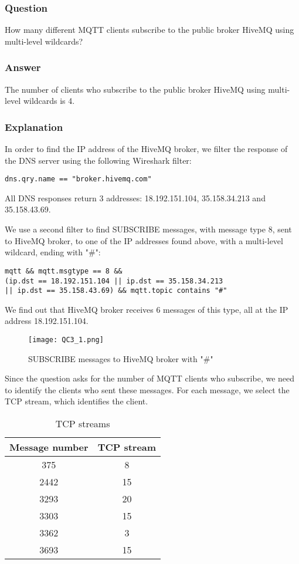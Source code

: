 \subsubsection{Question}
How many different MQTT clients subscribe to the public broker HiveMQ using multi-level wildcards?

\subsubsection{Answer}
The number of clients who subscribe to the public broker HiveMQ using multi-level wildcards is 4.

\subsubsection{Explanation}
In order to find the IP address of the HiveMQ broker, we filter the response of the DNS server using the following Wireshark filter:
\begin{verbatim}
dns.qry.name == "broker.hivemq.com"
\end{verbatim}
All DNS responses return 3 addresses: 18.192.151.104, 35.158.34.213 and 35.158.43.69.

We use a second filter to find SUBSCRIBE messages, with message type 8, sent to HiveMQ broker, to one of the IP addresses found above, with a multi-level wildcard, ending with "\#": 
\begin{verbatim}
mqtt && mqtt.msgtype == 8 && 
(ip.dst == 18.192.151.104 || ip.dst == 35.158.34.213 
|| ip.dst == 35.158.43.69) && mqtt.topic contains "#"
\end{verbatim}
We find out that HiveMQ broker receives 6 messages of this type, all at the IP address 18.192.151.104.

\begin{figure}[H]
    \centering
    \texttt{[image: QC3\_1.png]}
    \caption{SUBSCRIBE messages to HiveMQ broker with "\#"}
\end{figure}

Since the question asks for the number of MQTT clients who subscribe, we need to identify the clients who sent these messages. For each message, we select the TCP stream, which identifies the client.\\

\begin{table}[H]
\centering 
\begin{tabular}{| c | c |}
	\hline 
	\rowcolor{bluepoli!40}
	\textbf{Message number} & \textbf{TCP stream}\T\B \\
	\hline 
	375 & 8 \T\B\\
	2442 & 15 \T\B\\
	3293 & 20 \T\B\\
	3303 & 15 \T\B\\
	3362 & 3 \T\B\\
	3693  & 15 \T\B\\
	\hline
\end{tabular}
\\[10pt]
\caption{TCP streams}
\label{table:tcp_streams}
\end{table}

